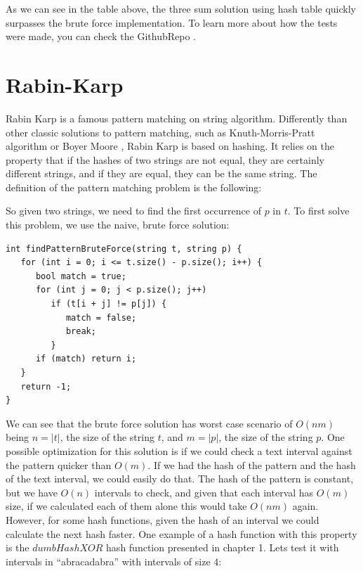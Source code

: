 As we can see in the table above, the three sum solution using hash table quickly surpasses the brute force implementation. To learn more about how the tests were made, you can check the GithubRepo \citep{GithubRepo}.
\section{Rabin-Karp}
Rabin Karp is a famous pattern matching on string algorithm. Differently than other classic solutions to pattern matching, such as Knuth-Morris-Pratt \citep{KMSWiki} algorithm or Boyer Moore \citep{BMWiki}, Rabin Karp is based on hashing. It relies on the property that if the hashes of two strings are not equal, they are certainly different strings, and if they are equal, they can be the same string. The definition of the pattern matching problem is the following:


So given two strings, we need to find the first occurrence of \( p \) in \( t \). To first solve this problem, we use the naive, brute force solution:
\begin{lstlisting}
int findPatternBruteForce(string t, string p) {
   for (int i = 0; i <= t.size() - p.size(); i++) {
      bool match = true;
      for (int j = 0; j < p.size(); j++)
         if (t[i + j] != p[j]) {
            match = false;
            break;
         }
      if (match) return i;
   }
   return -1;
}
\end{lstlisting}

We can see that the brute force solution has worst case scenario of \( O(nm) \) being \( n = |t| \), the size of the string \( t \), and \( m = |p| \), the size of the string \( p \). One possible optimization for this solution is if we could check a text interval against the pattern quicker than \( O(m) \). If we had the hash of the pattern and the hash of the text interval, we could easily do that. The hash of the pattern is constant, but we have \( O(n) \) intervals to check, and given that each interval has \( O(m) \) size, if we calculated each of them alone this would take \( O(nm) \) again. However, for some hash functions, given the hash of an interval we could calculate the next hash faster. One example of a hash function with this property is the \( dumbHashXOR \) hash function presented in chapter 1. Lets test it with intervals in ``abracadabra'' with intervals of size 4:

